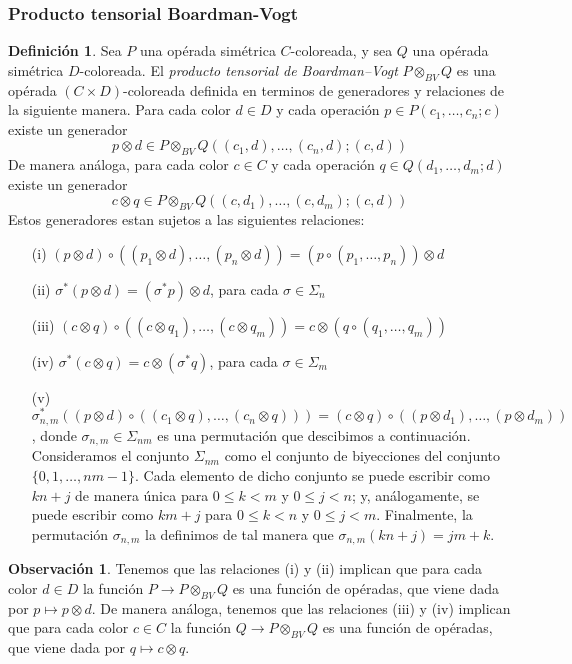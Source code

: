 \documentclass[11pt,a4paper,openright,oneside]{article}
\numberwithin{equation}{section}
\theoremstyle{definition}
\newtheorem{defi}[teo]{Definici\'on}
\newtheorem{obs}[teo]{Observaci\'on}
\begin{document}
\subsubsection{Producto tensorial Boardman-Vogt}
\begin{defi}
    Sea $P$ una op\'erada sim\'etrica $C$-coloreada, y sea $Q$ una op\'erada sim\'etrica $D$-coloreada. El \emph{producto tensorial de Boardman--Vogt} $P\otimes_{BV}Q$ es una op\'erada $(C\times D)$-coloreada definida en terminos de generadores y relaciones de la siguiente manera.
    Para cada color $d\in D$ y cada operaci\'on $p\in P(c_1,\dots,c_n;c)$ existe un generador
    $$
        p \otimes d \in P\otimes_{BV}Q((c_1,d),\dots,(c_n,d);(c,d))
    $$
    De manera an\'aloga, para cada color $c\in C$ y cada operaci\'on $q\in Q(d_1,\dots,d_m;d)$ existe un generador
    $$
        c \otimes q \in P\otimes_{BV}Q((c,d_1),\dots,(c,d_m);(c,d))
    $$
    Estos generadores estan sujetos a las siguientes relaciones:
    \begin{enumerate}
        \item[{\rm (i)}] $(p\otimes d) \circ ((p_1\otimes d),\dots,(p_n\otimes d)) = (p\circ(p_1,\dots,p_n))\otimes d$
        \item[{\rm (ii)}] $\sigma^{*}(p\otimes d) = (\sigma^{*}p)\otimes d$, para cada $\sigma\in\Sigma_n$
        \item[{\rm (iii)}] $(c\otimes q) \circ ((c\otimes q_1),\dots,(c\otimes q_m)) = c\otimes (q\circ(q_1,\dots,q_m))$
        \item[{\rm (iv)}] $\sigma^{*}(c\otimes q) = c\otimes (\sigma^{*}q)$, para cada $\sigma\in\Sigma_m$
        \item[{\rm (v)}] $\sigma_{n,m}^{*}((p\otimes d)\circ((c_1\otimes q),\dots,(c_n\otimes q))) = (c\otimes q)\circ((p\otimes d_1),\dots,(p\otimes d_m))$, donde $\sigma_{n,m}\in\Sigma_{nm}$ es una permutaci\'on que descibimos a continuaci\'on.
              Consideramos el conjunto $\Sigma_{nm}$ como el conjunto de biyecciones del conjunto $\{0,1,\dots,nm-1\}$. Cada elemento de dicho conjunto se puede escribir como $kn+j$ de manera \'unica para $0\le k<m$ y $0\le j<n$; y, an\'alogamente, se puede escribir como $km+j$ para $0\le k<n$ y $0\le j<m$.
              Finalmente, la permutaci\'on $\sigma_{n,m}$ la definimos de tal manera que $\sigma_{n,m}(kn+j) = jm+k$.
    \end{enumerate}
\end{defi}
\begin{obs}
    Tenemos que las relaciones (i) y (ii) implican que para cada color $d\in D$ la funci\'on $P\to P\otimes_{BV}Q$ es una funci\'on de op\'eradas, que viene dada por $p\mapsto p\otimes d$. De manera an\'aloga, tenemos que las relaciones (iii) y (iv) implican que para cada color $c\in C$ la funci\'on $Q\to P\otimes_{BV}Q$ es una funci\'on de op\'eradas, que viene dada por $q\mapsto c\otimes q$.
\end{obs}
\end{document}
